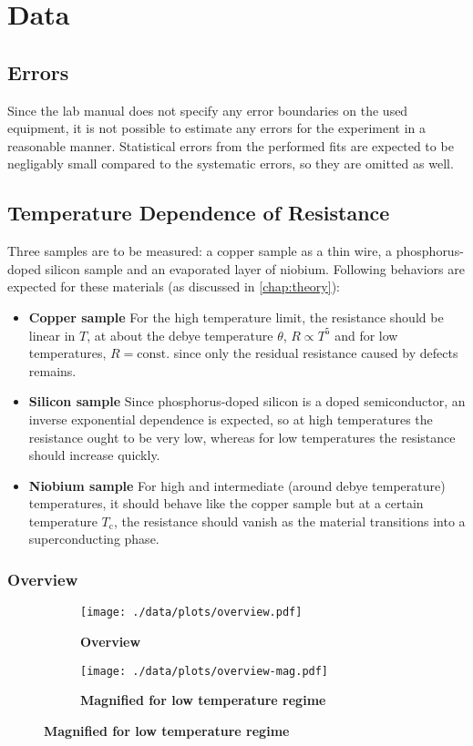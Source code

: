 \chapter{Data}

\section{Errors}
Since the lab manual does not specify any error boundaries on the used equipment, it is not possible to estimate any errors for the experiment in a reasonable manner.
Statistical errors from the performed fits are expected to be negligably small compared to the systematic errors, so they are omitted as well.

\section{Temperature Dependence of Resistance}\label{sec:samples}
Three samples are to be measured: a copper sample as a thin wire, a phosphorus-doped silicon sample and an evaporated layer of niobium.
Following behaviors are expected for these materials (as discussed in \autoref{chap:theory}):
\begin{itemize}
	\item \textbf{Copper sample} For the high temperature limit, the resistance should be linear in $T$, at about the debye temperature $\theta$, $R\propto T^5$ and for low temperatures, $R=\text{const.}$ since only the residual resistance caused by defects remains.
	\item \textbf{Silicon sample} Since phosphorus-doped silicon is a doped semiconductor, an inverse exponential dependence is expected, so at high temperatures the resistance ought to be very low, whereas for low temperatures the resistance should increase quickly.
	\item \textbf{Niobium sample} For high and intermediate (around debye temperature) temperatures, it should behave like the copper sample but at a certain temperature $T_\text{c}$, the resistance should vanish as the material transitions into a superconducting phase.
\end{itemize}

\subsection{Overview}
\begin{figure}
	\centering
	\begin{subfigure}{\textwidth}
		\centering
		\texttt{[image: ./data/plots/overview.pdf]}
		\caption{\textbf{Overview}}
	\end{subfigure}
	\hspace*{\fill}
	\begin{subfigure}{\textwidth}
		\centering
		\texttt{[image: ./data/plots/overview-mag.pdf]}
		\caption{\textbf{Magnified for low temperature regime}}
	\end{subfigure}
	\label{fig:overview}
\end{figure}

